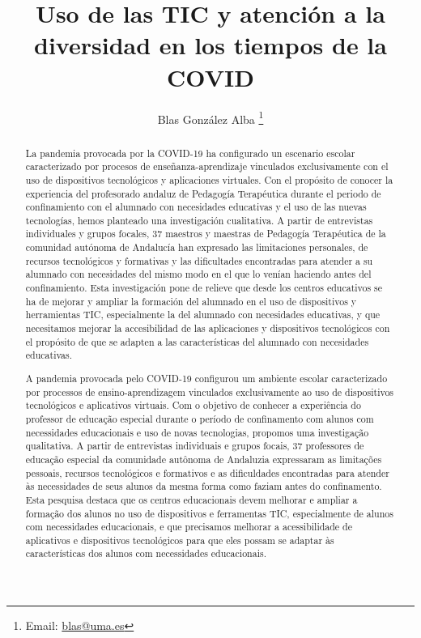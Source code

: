\documentclass{textolivre}
\title{Uso de las TIC y atención a la diversidad en los tiempos de  la COVID}
\author[1]{Blas González Alba \orcid{0000-0002-4769-6522} \thanks{Email: \url{blas@uma.es}}}
\affil[1]{Universidad de Málaga, Facultad de
Ciencias de la Educación, Departamento de didáctica y organización
escolar. Málaga, Andalucía y España.}
\begin{document}
\maketitle

\begin{polyabstract}
\begin{abstract}
La pandemia provocada por la COVID-19 ha configurado un escenario escolar caracterizado por procesos de enseñanza-aprendizaje vinculados exclusivamente con el uso de dispositivos tecnológicos y aplicaciones virtuales. Con el propósito de conocer la experiencia del profesorado andaluz de Pedagogía Terapéutica durante el periodo de confinamiento con el alumnado con necesidades educativas y el uso de las nuevas tecnologías, hemos planteado una investigación cualitativa. A partir de entrevistas individuales y grupos focales, 37 maestros y maestras de Pedagogía Terapéutica de la comunidad autónoma de Andalucía han expresado las limitaciones personales, de recursos tecnológicos y formativas y las dificultades encontradas para atender a su alumnado con necesidades del mismo modo en el que lo venían haciendo antes del confinamiento. Esta investigación pone de relieve que desde los centros educativos se ha de mejorar y ampliar la formación del alumnado en el uso de dispositivos y herramientas TIC, especialmente la del alumnado con necesidades educativas, y que necesitamos mejorar la accesibilidad de las aplicaciones y dispositivos tecnológicos con el propósito de que se adapten a las características del alumnado con necesidades educativas. 

\end{abstract}

\begin{portuguese}
\begin{abstract}
A pandemia provocada pelo COVID-19 configurou um ambiente escolar caracterizado por processos de ensino-aprendizagem vinculados exclusivamente ao uso de dispositivos tecnológicos e aplicativos virtuais. Com o objetivo de conhecer a experiência do professor de educação especial durante o período de confinamento com alunos com necessidades educacionais e uso de novas tecnologias, propomos uma investigação qualitativa. A partir de entrevistas individuais e grupos focais, 37 professores de educação especial da comunidade autônoma de Andaluzia expressaram as limitações pessoais, recursos tecnológicos e formativos e as dificuldades encontradas para atender às necessidades de seus alunos da mesma forma como faziam antes do confinamento. Esta pesquisa destaca que os centros educacionais devem melhorar e ampliar a formação dos alunos no uso de dispositivos e ferramentas TIC, especialmente de alunos com necessidades educacionais, e que precisamos melhorar a acessibilidade de aplicativos e dispositivos tecnológicos para que eles possam se adaptar às características dos alunos com necessidades educacionais.


\end{abstract}
\end{portuguese}
\end{polyabstract}
\end{document}
